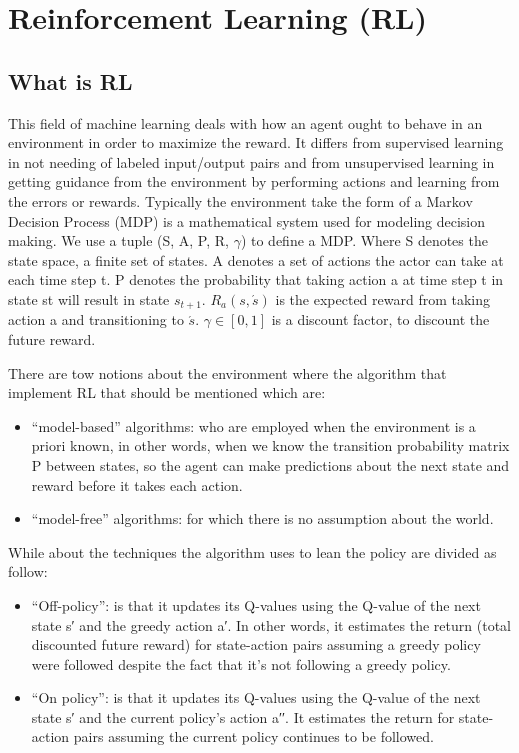 

\pagestyle{fancy} 
\chapter{Reinforcement Learning (RL)}
\label{cha:3}
\vspace{1cm}

\section{What is RL}
This field of machine learning deals with how an agent ought to behave in an environment in order to maximize the reward. It differs from supervised learning in not needing of labeled input/output pairs and from unsupervised learning in getting guidance from the environment by performing actions and learning from the errors or rewards. Typically the environment take the form of a Markov Decision Process (MDP) is a mathematical system used for modeling decision making. We use a tuple (S, A, P, R, $\gamma$) to define a MDP. Where S denotes the state space, a finite set of states. A denotes a set of actions the actor can take at each time step t. P denotes the probability that taking action a at time step t in state st will result in state $s_{t+1}$. $R_a(s,\acute{s})$ is the expected reward from taking action a and transitioning to $\acute{s}$. $\gamma \in [0, 1]$ is a discount factor, to discount the future reward.

\vspace{0.3cm}
There are tow notions about the environment where the algorithm that implement RL that should be mentioned which are:
\begin{itemize}
\item “model-based” algorithms: who are employed when the environment is a priori known, in other words, when we know the transition probability matrix P between states, so the agent can make predictions about the next state and reward before it takes each action.
\end{itemize}
\begin{itemize}
\item “model-free” algorithms: for which there is no assumption about the world.
\end{itemize}
While about the techniques the algorithm uses to lean the policy are divided as follow:
\begin{itemize}
\item	“Off-policy”: is that it updates its Q-values using the Q-value of the next state s′ and the greedy action a′. In other words, it estimates the return (total discounted future reward) for state-action pairs assuming a greedy policy were followed despite the fact that it's not following a greedy policy.
\end{itemize}
\begin{itemize}
\item	“On policy”: is that it updates its Q-values using the Q-value of the next state s′ and the current policy's action a′′. It estimates the return for state-action pairs assuming the current policy continues to be followed.
\end{itemize}

